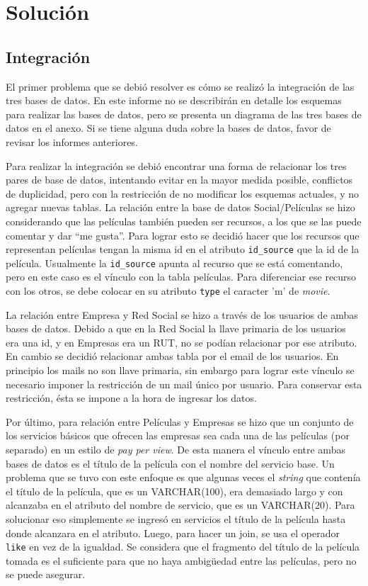\documentclass[12pt,letterpaper]{article}
\begin{document}
\section{Solución}

\subsection{Integración}

El primer problema que se debió resolver es cómo se realizó la integración de las tres bases de datos. En este informe no se describirán en detalle los esquemas para realizar las bases de datos, pero se presenta un diagrama de las tres bases de datos en el anexo.
Si se tiene alguna duda sobre la bases de datos, favor de revisar los informes anteriores.

Para realizar la integración se debió encontrar una forma de relacionar los tres pares de base de datos, intentando evitar en la mayor medida posible, conflictos de duplicidad, pero con la restricción de no modificar los esquemas actuales, y no agregar nuevas tablas. La relación entre la base de datos Social/Películas se hizo considerando que las películas también pueden ser recursos, a los que se las puede comentar y dar ``me gusta''. Para lograr esto se decidió hacer que los recursos que representan películas tengan la misma id en el atributo \texttt{id\_source} que la id de la película. Usualmente la \texttt{id\_source} apunta al recurso que se está comentando, pero en este caso es el vínculo con la tabla películas. Para diferenciar ese recurso con los otros, se debe colocar en su atributo \texttt{type} el caracter 'm' de \emph{movie}.

La relación entre Empresa y Red Social se hizo a través de los usuarios de ambas bases de datos. Debido a que en la Red Social la llave primaria de los usuarios era una id, y en Empresas era un RUT, no se podían relacionar por ese atributo. En cambio se decidió relacionar ambas tabla por el email de los usuarios. En principio los mails no son llave primaria, sin embargo para lograr este vínculo se necesario imponer la restricción de un mail único por usuario. Para conservar esta restricción, ésta se impone a la hora de ingresar los datos.

Por último, para relación entre Películas y Empresas se hizo que un conjunto de los servicios básicos que ofrecen las empresas sea cada una de las películas (por separado) en un estilo de \emph{pay per view}. De esta manera el vínculo entre ambas bases de datos es el título de la película con el nombre del servicio base. Un problema que se tuvo con este enfoque es que algunas veces el \emph{string} que contenía el título de la película, que es un VARCHAR(100), era demasiado largo y con alcanzaba en el atributo del nombre de servicio, que es un VARCHAR(20). Para solucionar eso simplemente se ingresó en servicios el título de la película hasta donde alcanzara en el atributo. Luego, para hacer un join, se usa el operador \texttt{like} en vez de la igualdad. Se considera que el fragmento del título de la película tomada es el suficiente para que no haya ambigüedad entre las películas, pero no se puede asegurar.
\end{document}

